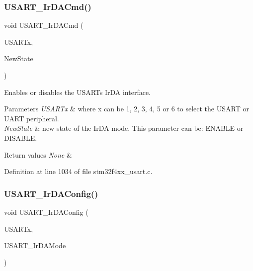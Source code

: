 \subsubsection{\texorpdfstring{U\+S\+A\+R\+T\+\_\+\+Ir\+D\+A\+Cmd()}{USART\_IrDACmd()}}
{\footnotesize\ttfamily void U\+S\+A\+R\+T\+\_\+\+Ir\+D\+A\+Cmd (\begin{DoxyParamCaption}\item[{\hyperlink{struct_u_s_a_r_t___type_def}{U\+S\+A\+R\+T\+\_\+\+Type\+Def} $\ast$}]{U\+S\+A\+R\+Tx,  }\item[{Functional\+State}]{New\+State }\end{DoxyParamCaption})}



Enables or disables the U\+S\+A\+RT\textquotesingle{}s Ir\+DA interface. 


\begin{DoxyParams}{Parameters}
{\em U\+S\+A\+R\+Tx} & where x can be 1, 2, 3, 4, 5 or 6 to select the U\+S\+A\+RT or U\+A\+RT peripheral. \\
\hline
{\em New\+State} & new state of the Ir\+DA mode. This parameter can be\+: E\+N\+A\+B\+LE or D\+I\+S\+A\+B\+LE. \\
\hline
\end{DoxyParams}

\begin{DoxyRetVals}{Return values}
{\em None} & \\
\hline
\end{DoxyRetVals}


Definition at line 1034 of file stm32f4xx\+\_\+usart.\+c.

\mbox{\label{group___u_s_a_r_t___group7_ga81a0cd36199040bf6d266b57babd678e}} 
\subsubsection{\texorpdfstring{U\+S\+A\+R\+T\+\_\+\+Ir\+D\+A\+Config()}{USART\_IrDAConfig()}}
{\footnotesize\ttfamily void U\+S\+A\+R\+T\+\_\+\+Ir\+D\+A\+Config (\begin{DoxyParamCaption}\item[{\hyperlink{struct_u_s_a_r_t___type_def}{U\+S\+A\+R\+T\+\_\+\+Type\+Def} $\ast$}]{U\+S\+A\+R\+Tx,  }\item[{uint16\+\_\+t}]{U\+S\+A\+R\+T\+\_\+\+Ir\+D\+A\+Mode }\end{DoxyParamCaption})}



